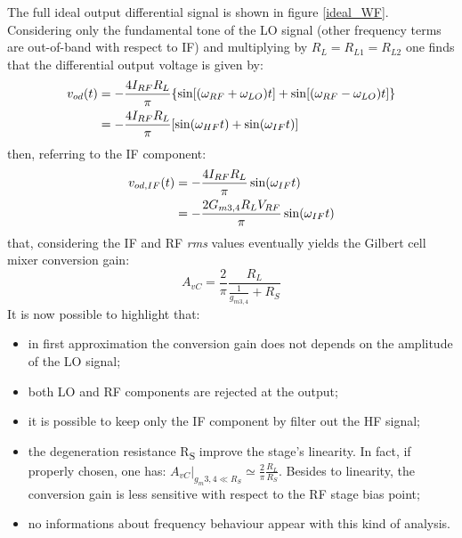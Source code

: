 The full ideal output differential signal is shown in figure \ref{ideal_WF}. Considering only the fundamental tone of the LO signal (other frequency terms are out-of-band with respect to IF) and multiplying by $R_L=R_{L1}=R_{L2}$ one finds that the differential output voltage is given by:
\begin{align}
v_{od}(t)& = -\frac{4I_{RF}R_L}{\pi}\{\sin[(\omega_{RF}+\omega_{LO}) t]+\sin[(\omega_{RF}-\omega_{LO}) t]\} \notag \\
& = -\frac{4I_{RF}R_L}{\pi}[\sin(\omega_{HF} t)+\sin(\omega_{IF} t)]
\end{align}
then, referring to the IF component:
\begin{align}
v_{od,IF}(t)& = -\frac{4I_{RF}R_L}{\pi}\sin(\omega_{IF} t) \notag \\
& = -\frac{2G_{m3,4}R_LV_{RF}}{\pi}\sin(\omega_{IF} t) 
\end{align}
that, considering the IF and RF \emph{rms} values eventually yields the Gilbert cell mixer conversion gain:
\begin{equation}
\label{eq:ConvGain}
A_{vC} = \frac{2}{\pi}\frac{R_L}{\frac{1}{g_{m3,4}}+R_S}
\end{equation}
It is now possible to highlight that:
\begin{itemize}
	\item in first approximation the conversion gain does not depends on the amplitude of the LO signal;
	\item both LO and RF components are rejected at the output;
	\item it is possible to keep only the IF component by filter out the HF signal;
	\item the degeneration resistance R\textsubscript{S} improve the stage's linearity. In fact, if properly chosen, one has: $A_{vC}|_{g_m3,4 \ll R_S}\simeq\frac{2}{\pi}\frac{R_L}{R_S}$. Besides to linearity, the conversion gain is less sensitive with respect to the RF stage bias point;
	\item no informations about frequency behaviour appear with this kind of analysis.
\end{itemize}  


